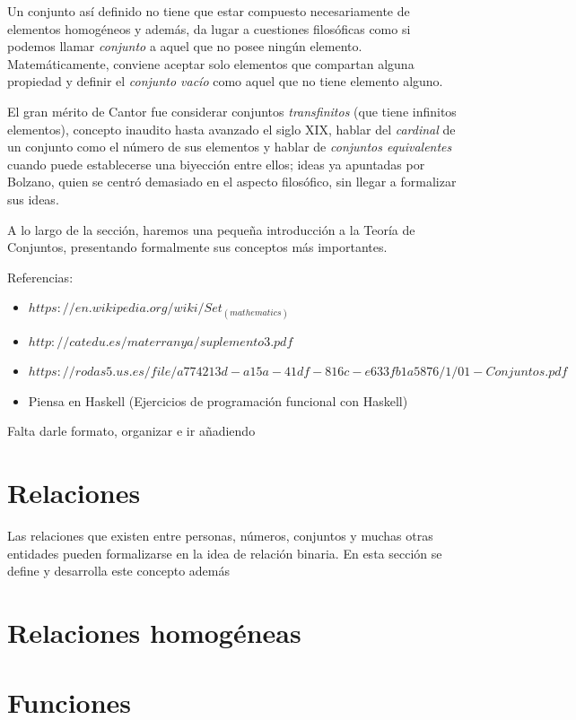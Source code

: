 Un conjunto así definido no tiene que estar compuesto necesariamente
de elementos homogéneos y además, da lugar a cuestiones filosóficas como 
si podemos llamar \textit{conjunto} a aquel que no posee ningún elemento. 
Matemáticamente, conviene aceptar solo elementos que compartan alguna 
propiedad y definir el \textit{conjunto vacío} como aquel que no tiene 
elemento alguno.

El gran mérito de Cantor fue considerar conjuntos \textit{transfinitos} 
(que tiene infinitos elementos), concepto inaudito hasta avanzado el siglo 
XIX, hablar del \textit{cardinal} de un conjunto como el número de sus
elementos y hablar de \textit{conjuntos equivalentes} cuando puede
establecerse una biyección entre ellos; ideas ya apuntadas por Bolzano,
quien se centró demasiado en el aspecto filosófico, sin llegar a formalizar
sus ideas.

A lo largo de la sección, haremos una pequeña introducción a la Teoría de 
Conjuntos, presentando formalmente sus conceptos más importantes.

\begin{comentario}
Referencias:
\begin{itemize}
  \item $https://en.wikipedia.org/wiki/Set_(mathematics)$
  \item $http://catedu.es/materranya/suplemento3.pdf$
  \item $https://rodas5.us.es/file/a774213d-a15a-41df-816c-e633fb1a5876/1/01-Conjuntos.pdf$
  \item Piensa en Haskell (Ejercicios de programación funcional con Haskell)
\end{itemize}

Falta darle formato, organizar e ir añadiendo
\end{comentario}


\section{Relaciones}

Las relaciones que existen entre personas, números, conjuntos y muchas
otras entidades pueden formalizarse en la idea de relación binaria. En esta 
sección se define y desarrolla este concepto además 


\section{Relaciones homogéneas}


\section{Funciones}


